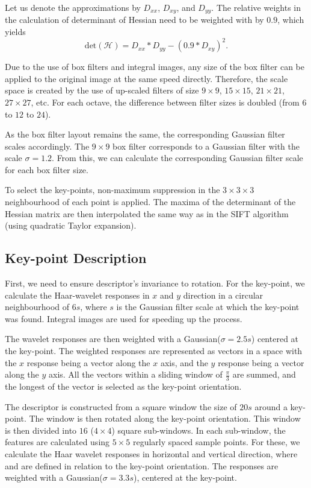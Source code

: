 Let us denote the approximations by $D_{xx}$, $D_{xy}$, and $D_{yy}$. The relative weights in the calculation of determinant of Hessian need to be weighted with by $0.9$, which yields
\begin{equation}
    \text{det}(\mathcal{H}) = D_{xx} * D_{yy} - (0.9 * D_{xy})^{2}.
\end{equation}

Due to the use of box filters and integral images, any size of the box filter can be applied to the original image at the same speed directly. Therefore, the scale space is created by the use of up-scaled filters of size $9\times9$, $15\times15$, $21\times21$, $27\times27$, etc. For each octave, the difference between filter sizes is doubled (from $6$ to $12$ to $24$).

As the box filter layout remains the same, the corresponding Gaussian filter scales accordingly. The $9\times9$ box filter corresponds to a Gaussian filter with the scale $\sigma = 1.2$. From this, we can calculate the corresponding Gaussian filter scale for each box filter size.

To select the key-points, non-maximum suppression in the $3\times3\times3$ neighbourhood of each point is applied. The maxima of the determinant of the Hessian matrix are then interpolated the same way as in the SIFT algorithm (using quadratic Taylor expansion).

\subsection{Key-point Description}
First, we need to ensure descriptor's invariance to rotation. For the key-point, we calculate the Haar-wavelet responses in $x$ and $y$ direction in a circular neighbourhood of $6s$, where $s$ is the Gaussian filter scale at which the key-point was found. Integral images are used for speeding up the process.

The wavelet responses are then weighted with a Gaussian($\sigma = 2.5 s$) centered at the key-point. The weighted responses are represented as vectors in a space with the $x$ response being a vector along the $x$ axis, and the $y$ response being a vector along the $y$ axis. All the vectors within a sliding window of $\frac{\pi}{3}$ are summed, and the longest of the vector is selected as the key-point orientation.

The descriptor is constructed from a square window the size of $20s$ around a key-point. The window is then rotated along the key-point orientation. This window is then divided into $16$ ($4\times4$) square sub-windows. In each sub-window, the features are calculated using $5\times5$ regularly spaced sample points. For these, we calculate the Haar wavelet responses in horizontal and vertical direction, where  and  are defined in relation to the key-point orientation. The responses are weighted with a Gaussian($\sigma = 3.3s$), centered at the key-point.

